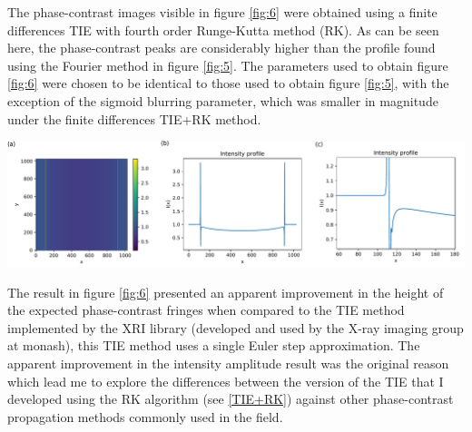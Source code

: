 \documentclass[10pt, a4paper, singlespacing]{report}
\newenvironment{Figure}
    {\par\medskip\noindent\minipage{\linewidth}}
    {\endminipage\par\medskip}
\begin{document}
The phase-contrast images visible in figure \ref{fig:6} were obtained using a finite differences TIE with fourth order Runge-Kutta method (RK). As can be seen here, the phase-contrast peaks are considerably higher than the profile found using the Fourier method in figure \ref{fig:5}. The parameters used to obtain figure \ref{fig:6} were chosen to be identical to those used to obtain figure \ref{fig:5}, with the exception of the sigmoid blurring parameter, which was smaller in magnitude under the finite differences TIE+RK method.
\begin{Figure} 
\centering
\includegraphics[width=\linewidth]{FD_intensity_profile.pdf}
\label{fig:6} 
\end{Figure}
The result in figure \ref{fig:6} presented an apparent improvement in the height of the expected phase-contrast fringes when compared to the TIE method implemented by the XRI library (developed and used by the X-ray imaging group at monash), this TIE method uses a single Euler step approximation. The apparent improvement in the intensity amplitude result was the original reason which lead me to explore the differences between the version of the TIE that I developed using the RK algorithm (see \ref{TIE+RK}) against other phase-contrast propagation methods commonly used in the field.
\end{document}
